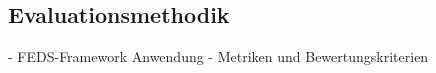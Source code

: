 \subsection{Evaluationsmethodik} \label{sec:Evaluationsmethodik}

- FEDS-Framework Anwendung
- Metriken und Bewertungskriterien